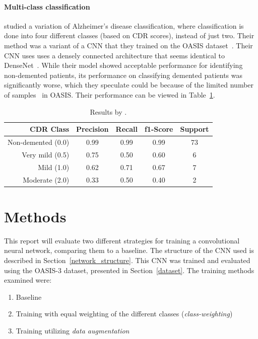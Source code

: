 \documentclass{kththesis}
\begin{document}
\subsubsection{Multi-class classification}
\textcite{islam2018early} studied a variation of Alzheimer's disease classification, where classification is done into four different classes (based on CDR scores), instead of just two. Their method was a variant of a CNN that they trained on the OASIS dataset~\cite{oasis}. Their CNN uses uses a densely connected architecture that seems identical to DenseNet~\cite{huang2017densely}. While their model showed acceptable performance for identifying non-demented patients, its performance on classifying demented patients was significantly worse, which they speculate could be because of the limited number of samples~\cite{islam2018early} in OASIS\@. Their performance can be viewed in Table~\ref{tab:results_islam_zhang}.

\begin{table}
  \begin{center}
    \caption{Results by \textcite{islam2018early}. \label{tab:results_islam_zhang}}
    \begin{tabular}{r|ccc|c}
      \textbf{CDR Class} & \textbf{Precision} & \textbf{Recall} & \textbf{f1-Score} & \textbf{Support} \\
      \toprule
      Non-demented (0.0) & 0.99 & 0.99 & 0.99 & 73 \\
      Very mild (0.5) & 0.75 & 0.50 & 0.60 & 6  \\
      Mild (1.0)         & 0.62 & 0.71 & 0.67 & 7  \\
      Moderate (2.0)     & 0.33 & 0.50 & 0.40 & 2   \\
    \end{tabular}
  \end{center}
\end{table}

\chapter{Methods} \label{methods}
This report will evaluate two different strategies for training a convolutional neural network, comparing them to a baseline. The structure of the CNN used is described in Section~\ref{network_structure}. This CNN was trained and evaluated using the OASIS-3 dataset, presented in Section~\ref{dataset}. The training methods examined were:
\begin{enumerate}
  \item Baseline
  \item Training with equal weighting of the different classes (\textit{class-weighting})
  \item Training utilizing \textit{data augmentation}
\end{enumerate}
\end{document}
